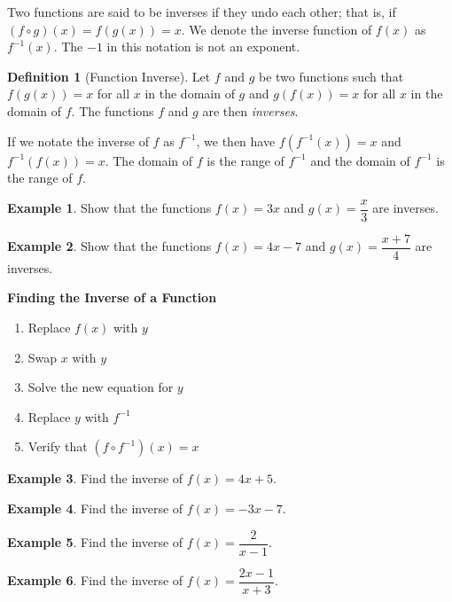 \documentclass[addpoints,12pt]{exam}
\theoremstyle{definition}
\newtheorem{example}{Example}[subsection]
\newtheorem{definition}{Definition}[subsection]
\begin{document}
Two functions are said to be inverses if they undo each other; that is, if $(f\circ g)(x) = f(g(x)) = x$. We denote the inverse function of $f(x)$ as $f^{-1}(x)$. The $-1$ in this notation is not an exponent.

\vspace{.2in}

\begin{definition}[Function Inverse]
Let $f$ and $g$ be two functions such that $f(g(x)) = x$ for all $x$ in the domain of $g$ and $g(f(x)) = x$ for all $x$ in the domain of $f$. The functions $f$ and $g$ are then \emph{inverses}.

\vspace{.2in}
If we notate the inverse of $f$ as $f^{-1}$, we then have $f(f^{-1}(x)) = x$ and $f^{-1}(f(x)) = x$. The domain of $f$ is the range of $f^{-1}$ and the domain of $f^{-1}$ is the range of $f$.
\end{definition}

\newpage

\begin{example}
Show that the functions $f(x) = 3x$ and $g(x) = \dfrac{x}{3}$ are inverses.
\vspace{3.5in}
\end{example}

\begin{example}
Show that the functions $f(x) = 4x-7$ and $g(x) = \dfrac{x+7}{4}$ are inverses.
\vspace{2.5in}
\end{example}

\newpage

\begin{mdframed}
\textbf{Finding the Inverse of a Function}
\vspace{.1in}
\begin{enumerate}
\item Replace $f(x)$ with $y$
\item Swap $x$ with $y$
\item Solve the new equation for $y$
\item Replace $y$ with $f^{-1}$
\item Verify that $(f\circ f^{-1})(x) = x$
\end{enumerate}

\end{mdframed}


\begin{example}
Find the inverse of $f(x) = 4x+5$.
\vspace{3.5in}
\end{example}

\begin{example}
Find the inverse of $f(x) = -3x - 7$.
\vspace{3.5in}
\end{example}

\newpage

\begin{example}
Find the inverse of $f(x) = \dfrac{2}{x-1}$.
\vspace{3.5in}
\end{example}

\begin{example}
Find the inverse of $f(x) = \dfrac{2x-1}{x+3}$.
\vspace{3.5in}
\end{example}
\end{document}
